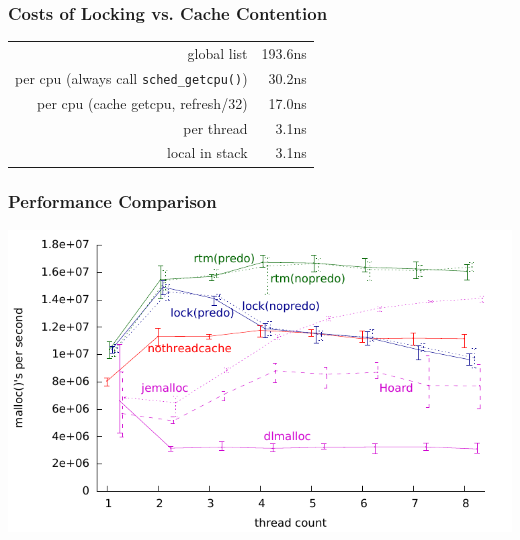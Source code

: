 \documentclass[xcolor=dvipsnames,14pt]{beamer}
\begin{document}
\begin{frame}
\frametitle{Costs of Locking vs. Cache Contention}

\begin{tabular}{rr}
                                                     global list &    193.6ns \\
            per cpu (always call \texttt{sched_getcpu()})  &     30.2ns \\
per cpu (cache getcpu, refresh/32) &     17.0ns \\
                                                      per thread &      3.1ns \\
                                                  local in stack &      3.1ns \\
\end{tabular}
\end{frame}

\begin{frame}
\frametitle{Performance Comparison}
\hspace*{-.7cm}\includegraphics{new-malloc-test-1K-aggregated.pdf}
\end{frame}
\end{document}
